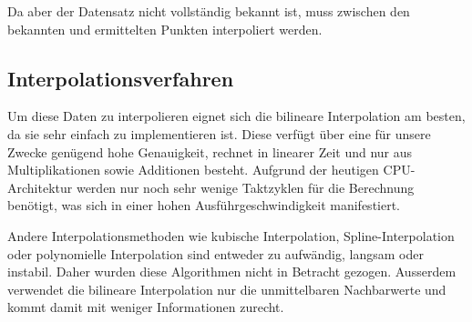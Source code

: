 Da aber der Datensatz nicht vollständig bekannt ist, muss zwischen den bekannten
und ermittelten Punkten interpoliert werden.

\subsection{Interpolationsverfahren}
Um diese Daten zu interpolieren eignet sich die bilineare Interpolation am
besten, da sie sehr einfach zu implementieren ist. Diese verfügt über eine für
unsere Zwecke genügend hohe Genauigkeit, rechnet in linearer Zeit und nur aus
Multiplikationen sowie Additionen besteht. Aufgrund der heutigen
CPU-Architektur werden nur noch sehr wenige Taktzyklen für die Berechnung
benötigt, was sich in einer hohen Ausführgeschwindigkeit manifestiert.

Andere Interpolationsmethoden wie kubische Interpolation, Spline-Interpolation
oder polynomielle Interpolation sind entweder zu aufwändig, langsam oder
instabil. Daher wurden diese Algorithmen nicht in Betracht gezogen. Ausserdem
verwendet die bilineare Interpolation nur die unmittelbaren Nachbarwerte und
kommt damit mit weniger Informationen zurecht.

